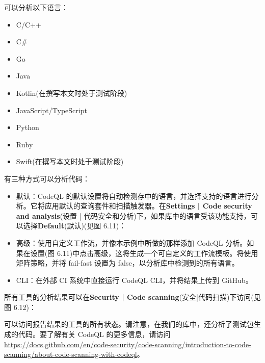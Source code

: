 可以分析以下语言：

\begin{itemize}
\item 
C/C++

\item 
C\#

\item 
Go

\item 
Java

\item 
Kotlin(在撰写本文时处于测试阶段)

\item 
JavaScript/TypeScript

\item 
Python

\item 
Ruby

\item 
Swift(在撰写本文时处于测试阶段)
\end{itemize}

有三种方式可以分析代码：

\begin{itemize}
\item 
默认：CodeQL 的默认设置将自动检测存中的语言，并选择支持的语言进行分析。它将应用默认的查询套件和扫描触发器。在\textbf{Settings | Code security and analysis}(设置 | 代码安全和分析)下，如果库中的语言受该功能支持，可以选择\textbf{Default}(默认)(见图 6.11)：


\item 
高级：使用自定义工作流，并像本示例中所做的那样添加 CodeQL 分析。如果在设置(图 6.11)中点击高级，这将生成一个可自定义的工作流模板。将使用矩阵策略，并将 fail-fast 设置为 false，以分析库中检测到的所有语言。

\item 
CLI：在外部 CI 系统中直接运行 CodeQL CLI，并将结果上传到 GitHub。
\end{itemize}

所有工具的分析结果可以在\textbf{Security | Code scanning}(安全|代码扫描)下访问(见图 6.12)：


可以访问报告结果的工具的所有状态。请注意，在我们的库中，还分析了测试包生成的代码。要了解有关 CodeQL 的更多信息，请访问\url{https://docs.github.com/en/code-security/code-scanning/introduction-to-code-scanning/about-code-scanning-with-codeql}。

